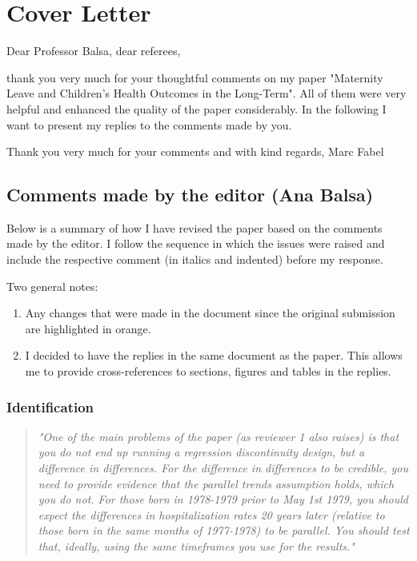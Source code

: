 \thispagestyle{empty}
\chapter*{Cover Letter}



Dear Professor Balsa, dear referees, 

thank you very much for your thoughtful comments on my paper "Maternity Leave and Children's Health Outcomes in the Long-Term". All of them were very helpful and enhanced the quality of the paper considerably. In the following I want to present my replies to the comments made by you. 



Thank you very much for your comments and with kind regards,
Marc Fabel 



\newpage
\section*{Comments made by the editor (Ana Balsa)}

Below is a summary of how I have revised the paper based on the comments made by the editor. I follow the sequence in which the issues were raised and include the respective comment (in italics and indented) before my response.

Two general notes:
\begin{enumerate}
	\item Any changes that were made in the document since the original submission are highlighted in orange. 
	\item I decided to have the replies in the same document as the paper. This allows me to provide cross-references to sections, figures and tables in the replies.
\end{enumerate}

\subsection*{Identification}

\begin{quote}
\textit{"One of the main problems of the paper (as reviewer 1 also raises) is that you do not end up running a regression discontinuity design, but a difference in differences. For the difference in differences to be credible, you need to provide evidence that the parallel trends assumption holds, which you do not. For those born in 1978-1979 prior to May 1st 1979, you should expect the differences in hospitalization rates 20 years later (relative to those born in the same months of 1977-1978) to be parallel. You should test that, ideally, using the same timeframes you use for the results."}
\end{quote}

